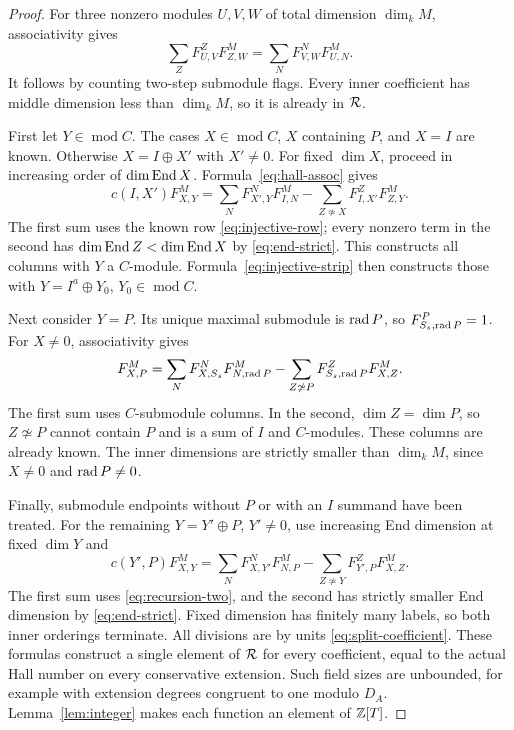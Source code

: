 \begin{proof}
For three nonzero modules $U,V,W$ of total dimension $\dim_kM$, associativity gives
\begin{equation}\label{eq:hall-assoc}
 \sum_Z F^Z_{U,V}F^M_{Z,W}
 =\sum_N F^N_{V,W}F^M_{U,N}.
\end{equation}
It follows by counting two-step submodule flags. Every inner coefficient has middle dimension less than $\dim_kM$, so it is already in $\mathcal R$.

First let $Y\in\operatorname{mod}C$. The cases $X\in\operatorname{mod}C$, $X$ containing $P$, and $X=I$ are known. Otherwise $X=I\oplus X'$ with $X'\ne0$. For fixed $\dim X$, proceed in increasing order of $\dim\operatorname{End} X$. Formula~\eqref{eq:hall-assoc} gives
\begin{equation}\label{eq:recursion-one}
 c(I,X')F^M_{X,Y}
 =\sum_N F^N_{X',Y}F^M_{I,N}
   -\sum_{Z\not\simeq X}F^Z_{I,X'}F^M_{Z,Y}.
\end{equation}
The first sum uses the known row \eqref{eq:injective-row}; every nonzero term in the second has $\dim\operatorname{End} Z<\dim\operatorname{End} X$ by \eqref{eq:end-strict}. This constructs all columns with $Y$ a $C$-module. Formula~\eqref{eq:injective-strip} then constructs those with $Y=I^a\oplus Y_0$, $Y_0\in\operatorname{mod}C$.

Next consider $Y=P$. Its unique maximal submodule is $\operatorname{rad} P$, so $F^P_{S_s,\operatorname{rad} P}=1$. For $X\ne0$, associativity gives
\begin{equation}\label{eq:recursion-two}
 F^M_{X,P}
 =\sum_N F^N_{X,S_s}F^M_{N,\operatorname{rad} P}
  -\sum_{Z\not\simeq P}F^Z_{S_s,\operatorname{rad} P}F^M_{X,Z}.
\end{equation}
The first sum uses $C$-submodule columns. In the second, $\dim Z=\dim P$, so $Z\not\simeq P$ cannot contain $P$ and is a sum of $I$ and $C$-modules. These columns are already known. The inner dimensions are strictly smaller than $\dim_kM$, since $X\ne0$ and $\operatorname{rad} P\ne0$.

Finally, submodule endpoints without $P$ or with an $I$ summand have been treated. For the remaining $Y=Y'\oplus P$, $Y'\ne0$, use increasing End dimension at fixed $\dim Y$ and
\begin{equation}\label{eq:recursion-three}
 c(Y',P)F^M_{X,Y}
 =\sum_N F^N_{X,Y'}F^M_{N,P}
  -\sum_{Z\not\simeq Y}F^Z_{Y',P}F^M_{X,Z}.
\end{equation}
The first sum uses \eqref{eq:recursion-two}, and the second has strictly smaller End dimension by \eqref{eq:end-strict}. Fixed dimension has finitely many labels, so both inner orderings terminate. All divisions are by units \eqref{eq:split-coefficient}. These formulas construct a single element of $\mathcal R$ for every coefficient, equal to the actual Hall number on every conservative extension. Such field sizes are unbounded, for example with extension degrees congruent to one modulo $D_A$. Lemma~\ref{lem:integer} makes each function an element of $\mathbb Z[T]$.
\end{proof}

